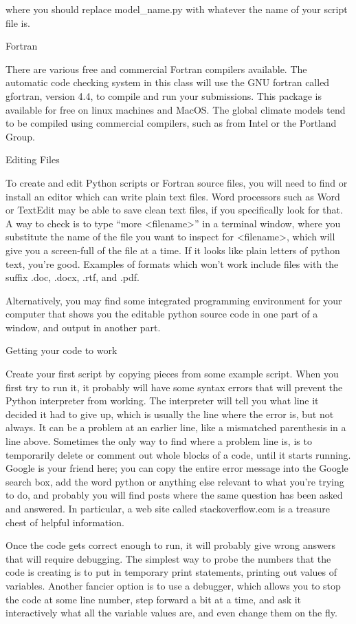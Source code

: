 where you should replace model_name.py with whatever the name of your script file is.

Fortran

There are various free and commercial Fortran compilers available. The automatic code checking system in this class will use the GNU fortran called gfortran, version 4.4, to compile and run your submissions. This package is available for free on linux machines and MacOS. The global climate models tend to be compiled using commercial compilers, such as from Intel or the Portland Group.

Editing Files

To create and edit Python scripts or Fortran source files, you will need to find or install an editor which can write plain text files. Word processors such as Word or TextEdit may be able to save clean text files, if you specifically look for that. A way to check is to type “more <filename>” in a terminal window, where you substitute the name of the file you want to inspect for <filename>, which will give you a screen-full of the file at a time. If it looks like plain letters of python text, you’re good. Examples of formats which won’t work include files with the suffix .doc, .docx, .rtf, and .pdf.

Alternatively, you may find some integrated programming environment for your computer that shows you the editable python source code in one part of a window, and output in another part.

Getting your code to work

Create your first script by copying pieces from some example script. When you first try to run it, it probably will have some syntax errors that will prevent the Python interpreter from working. The interpreter will tell you what line it decided it had to give up, which is usually the line where the error is, but not always. It can be a problem at an earlier line, like a mismatched parenthesis in a line above. Sometimes the only way to find where a problem line is, is to temporarily delete or comment out whole blocks of a code, until it starts running. Google is your friend here; you can copy the entire error message into the Google search box, add the word python or anything else relevant to what you’re trying to do, and probably you will find posts where the same question has been asked and answered. In particular, a web site called stackoverflow.com is a treasure chest of helpful information.

Once the code gets correct enough to run, it will probably give wrong answers that will require debugging. The simplest way to probe the numbers that the code is creating is to put in temporary print statements, printing out values of variables. Another fancier option is to use a debugger, which allows you to stop the code at some line number, step forward a bit at a time, and ask it interactively what all the variable values are, and even change them on the fly.


